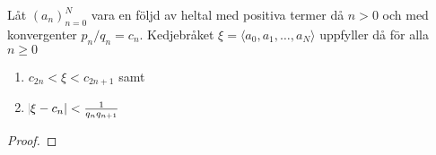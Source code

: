 
\begin{theorem} \label{app.kovfel}
    Låt \((a_n)_{n=0}^{N}\) vara en följd av heltal med positiva termer då \(n > 0\) och med konvergenter \(p_n / q_n = c_n\). Kedjebråket \(\xi = \langle a_0, a_1, \dots, a_N \rangle\) uppfyller då för alla \(n \geq 0\)
    \begin{enumerate}
        \item \(c_{2n} < \xi < c_{2n + 1}\) samt
        \item \(\abs{\xi - c_n} < \frac{1}{q_n q_{n + 1}}\) %
    \end{enumerate}
\end{theorem}
\begin{proof}
\end{proof}

